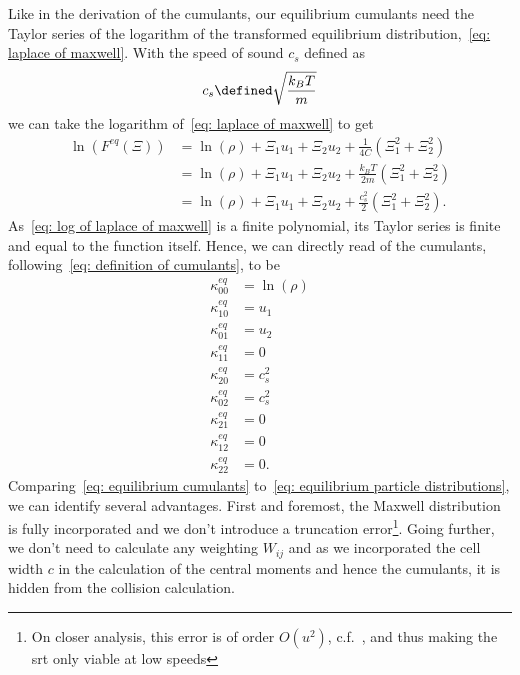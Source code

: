 
Like in the derivation of the cumulants, our equilibrium cumulants need the Taylor series of the logarithm of the transformed equilibrium distribution,~\eqref{eq: laplace of maxwell}.
With the speed of sound $c_s$ defined as
\begin{equation}
  c_s \defined \sqrt{\frac{k_B T}{m}}
\end{equation}
we can take the logarithm of~\eqref{eq: laplace of maxwell} to get
\begin{equation}
  \label{eq: log of laplace of maxwell}
  \begin{aligned}
    \ln(F^{eq}(\Xi))
      & = \ln(\rho) + \Xi_1 u_1 + \Xi_2 u_2 + \frac{1}{4C}\left(\Xi_1^2 + \Xi_2^2 \right) \\
      & = \ln(\rho) + \Xi_1 u_1 + \Xi_2 u_2 + \frac{k_B T}{2m}\left(\Xi_1^2 + \Xi_2^2 \right) \\
      & = \ln(\rho) + \Xi_1 u_1 + \Xi_2 u_2 + \frac{c_s^2}{2}\left(\Xi_1^2 + \Xi_2^2 \right).
  \end{aligned}
\end{equation}
As~\eqref{eq: log of laplace of maxwell} is a finite polynomial, its Taylor series is finite and equal to the function itself.
Hence, we can directly read of the cumulants, following~\eqref{eq: definition of cumulants}, to be
\begin{equation}
  \label{eq: equilibrium cumulants}
  \begin{aligned}
    \kappa_{00}^{eq} & = \ln(\rho) \\
    \kappa_{10}^{eq} & = u_1 \\
    \kappa_{01}^{eq} & = u_2 \\
    \kappa_{11}^{eq} & = 0 \\
    \kappa_{20}^{eq} & = c_s^2  \\
    \kappa_{02}^{eq} & = c_s^2  \\
    \kappa_{21}^{eq} & = 0 \\
    \kappa_{12}^{eq} & = 0 \\
    \kappa_{22}^{eq} & = 0.
  \end{aligned}
\end{equation}
Comparing~\eqref{eq: equilibrium cumulants} to~\eqref{eq: equilibrium particle distributions}, we can identify several advantages.
First and foremost, the Maxwell distribution is fully incorporated and we don't introduce a truncation error\footnote{On closer analysis, this error is of order $O(u^2)$, c.f.~\cite[page 178]{wolf2000lattice}, and thus making the \gls{srt} only viable at low speeds}. Going further, we don't need to calculate any weighting $W_{ij}$ and as we incorporated the cell width $c$ in the calculation of the central moments and hence the cumulants, it is hidden from the collision calculation.


